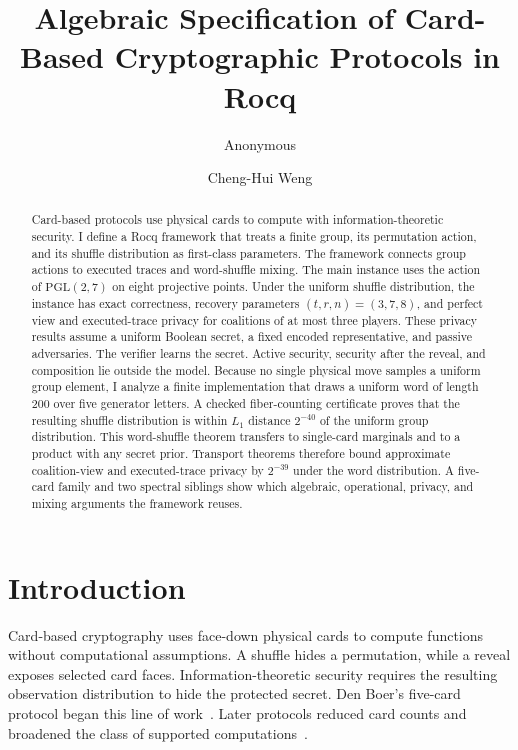 \documentclass[runningheads]{llncs}
\title{Algebraic Specification of Card-Based Cryptographic Protocols in Rocq}
\author{Anonymous}
\institute{Submission to WADT 2026}
\author{Cheng-Hui Weng}
\institute{Nagoya University}
\newcommand{\Rocq}{Rocq}
\newcommand{\PG}{\mathrm{PGL}(2,7)}
\begin{document}
\maketitle

\begin{abstract}
Card-based protocols use physical cards to compute with
information-theoretic security. I define a \Rocq{} framework that treats a
finite group, its permutation action, and its shuffle distribution as first-class
parameters. The framework connects group actions to executed traces and
word-shuffle mixing. The main instance uses the action of
$\PG$ on eight projective points. Under the uniform shuffle distribution, the
instance has exact correctness, recovery parameters $(t,r,n)=(3,7,8)$, and
perfect view and executed-trace privacy for coalitions of at most three players. These
privacy results assume a uniform Boolean secret, a fixed encoded
representative, and passive adversaries. The verifier learns the secret.
Active security, security after the reveal, and composition lie outside the
model. Because no single physical move samples a uniform group element, I
analyze a finite implementation that draws a uniform word of length 200
over five generator letters. A checked fiber-counting certificate proves that
the resulting shuffle distribution is within $L_1$ distance $2^{-40}$ of the
uniform group distribution. This word-shuffle theorem transfers to single-card
marginals and to a product with any secret prior. Transport theorems therefore bound approximate coalition-view and
executed-trace privacy by $2^{-39}$ under the word distribution. A five-card family and two spectral siblings
show which algebraic, operational, privacy, and mixing arguments the framework
reuses.
\end{abstract}

\section{Introduction}\label{sec:introduction}

Card-based cryptography uses face-down physical cards to compute functions
without computational assumptions. A shuffle hides a permutation, while a
reveal exposes selected card faces. Information-theoretic security requires
the resulting observation distribution to hide the protected secret. Den Boer's
five-card protocol began this line of work~\cite{denBoer1989}. Later protocols
reduced card counts and broadened the class of supported
computations~\cite{MizukiSone2009,MizukiSone2012,KochWalzerHartel2015}.
\end{document}
